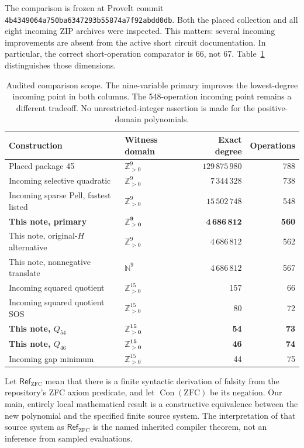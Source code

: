 \documentclass[11pt]{article}
\newcommand{\N}{\mathbb N}
\newcommand{\Pos}{\mathbb Z_{>0}}
\newcommand{\Con}{\operatorname{Con}}
\theoremstyle{remark}\newtheorem{remark}[theorem]{Remark}
\begin{document}
The comparison is frozen at ProveIt commit
\texttt{4b4349064a750ba6347293b55874a7f92abdd0db}.
Both the placed collection and all eight incoming ZIP archives were inspected.
This matters: several incoming improvements are absent from the active short
circuit documentation. In particular, the correct short-operation comparator
is 66, not 67. Table~\ref{tab:frontier} distinguishes those dimensions.

\begin{table}[ht]
\centering\small
\begin{tabular}{@{}llrr@{}}
\toprule
Construction & Witness domain & Exact degree & Operations\\
\midrule
Placed package 45 & $\Pos^9$ & $129\,875\,980$ & 788\\
Incoming selective quadratic & $\Pos^9$ & $7\,344\,328$ & 738\\
Incoming sparse Pell, fastest listed & $\Pos^9$ & $15\,502\,748$ & 548\\
\textbf{This note, primary} & $\boldsymbol{\Pos^9}$ & $\boldsymbol{4\,686\,812}$ & \textbf{560}\\
This note, original-$H$ alternative & $\Pos^9$ & $4\,686\,812$ & 562\\
This note, nonnegative translate & $\N^9$ & $4\,686\,812$ & 567\\
\midrule
Incoming squared quotient & $\Pos^{15}$ & 157 & 66\\
Incoming squared quotient SOS & $\Pos^{15}$ & 80 & 72\\
\textbf{This note, $Q_{54}$} & $\boldsymbol{\Pos^{15}}$ & \textbf{54} & \textbf{73}\\
\textbf{This note, $Q_{46}$} & $\boldsymbol{\Pos^{15}}$ & \textbf{46} & \textbf{74}\\
Incoming gap minimum & $\Pos^{15}$ & 44 & 75\\
\bottomrule
\end{tabular}
\caption{Audited comparison scope. The nine-variable primary improves the
lowest-degree incoming point in both columns. The 548-operation incoming
point remains a different tradeoff. No unrestricted-integer assertion is
made for the positive-domain polynomials.}
\label{tab:frontier}
\end{table}

Let $\mathsf{Ref}_{\mathrm{ZFC}}$ mean that there is a finite syntactic
derivation of falsity from the repository's ZFC axiom predicate, and let
$\Con(\mathrm{ZFC})$ be its negation. Our main, entirely local mathematical
result is a constructive equivalence between the new polynomial and the
specified finite source system. The interpretation of that source system
as $\mathsf{Ref}_{\mathrm{ZFC}}$ is the named inherited compiler theorem,
not an inference from sampled evaluations.
\end{document}
